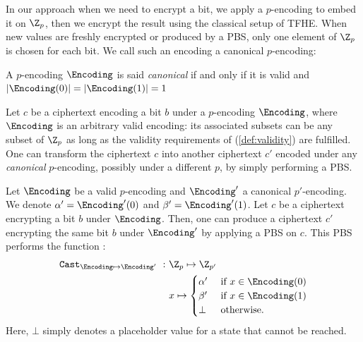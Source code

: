 In our approach when we need to encrypt a bit, we apply a $p$-encoding to embed it on $\Z_p$, then we encrypt the result using the classical setup of TFHE.  When new values are freshly encrypted or produced by a PBS, only one element of $ \Z_p$ is chosen for each bit. We call such an encoding a canonical $p$-encoding:

\begin{definition}
    A $p$-encoding $\Encoding$ is said \emph{canonical} if and only if it is valid and $\left| \Encoding(0) \right| = \left| \Encoding(1) \right| = 1$
    \label{def:canonical}
\end{definition}


Let $c$ be a ciphertext encoding a bit $b$ under a $p$-encoding $\Encoding$, where $\Encoding$ is an arbitrary valid encoding: its associated subsets can be any subset of $\Z_p$ as long as the validity requirements of (\ref{def:validity}) are fulfilled. One can transform the ciphertext $c$ into another ciphertext $c'$ encoded under any \emph{canonical} $p$-encoding, possibly under a different $p$, by simply performing a PBS.


\begin{property} 
    \label{prop:cast_valid_to_canonical}
    Let $\Encoding$ be a valid $p$-encoding and $\Encoding'$ a canonical $p'$-encoding. We denote $\alpha' = \Encoding'(0)$ and $\beta' = \Encoding'(1)$. Let $c$ be a ciphertext encrypting a bit $b$ under $\Encoding$. Then, one can produce a ciphertext $c'$ encrypting the same bit $b$ under $\Encoding'$ by applying a PBS on $c$. This PBS performs the function :
    \[
        \begin{aligned}
            \texttt{Cast}_{\Encoding \mapsto \Encoding'}~:~& \Z_p \mapsto \Z_{p'}\\
            & x \mapsto \begin{cases}
                            \alpha' & \text{ if } x \in \Encoding(0)\\
                            \beta' & \text{ if } x \in \Encoding(1)\\
                            \bot & \text{ otherwise.}
                        \end{cases}
        \end{aligned}
    \]
    Here, $\bot$ simply denotes a placeholder value for a state that cannot be reached.
\end{property}



